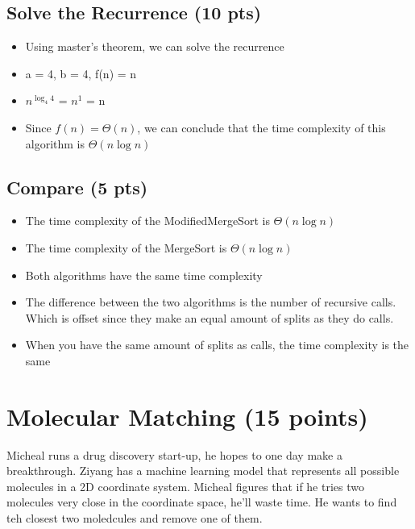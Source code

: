 \documentclass{article}[12pt]
\begin{document}
\vspace*{10px}
\subsection{Solve the Recurrence (10 pts)}

\begin{itemize}
  \item Using master's theorem, we can solve the recurrence
  \item a = 4, b = 4, f(n) = n
  \item $n^{\log_{4} 4}$ = $n^{1}$ = n
  \item Since $f(n) = \Theta(n)$, we can conclude that
    the time complexity of this algorithm is $\Theta(n \log n)$
\end{itemize}

\vspace*{10px}
\subsection{Compare (5 pts)}
\begin{itemize}
  \item The time complexity of the ModifiedMergeSort is $\Theta(n \log n)$
  \item The time complexity of the MergeSort is $\Theta(n \log n)$
  \item Both algorithms have the same time complexity
  \item The difference between the two algorithms is the number of recursive calls.
    Which is offset since they make an equal amount of splits as they do calls.
  \item When you have the same amount of splits as calls, the time complexity is the same
\end{itemize}

\newpage
\section{Molecular Matching (15 points)}
Micheal runs a drug discovery start-up, he hopes to one day make a breakthrough. Ziyang has a 
machine learning model that represents all possible molecules in a 2D coordinate system.
Micheal figures that if he tries two molecules very close in the coordinate space, he'll waste time.
He wants to find teh closest two moledcules and remove one of them.
\end{document}

